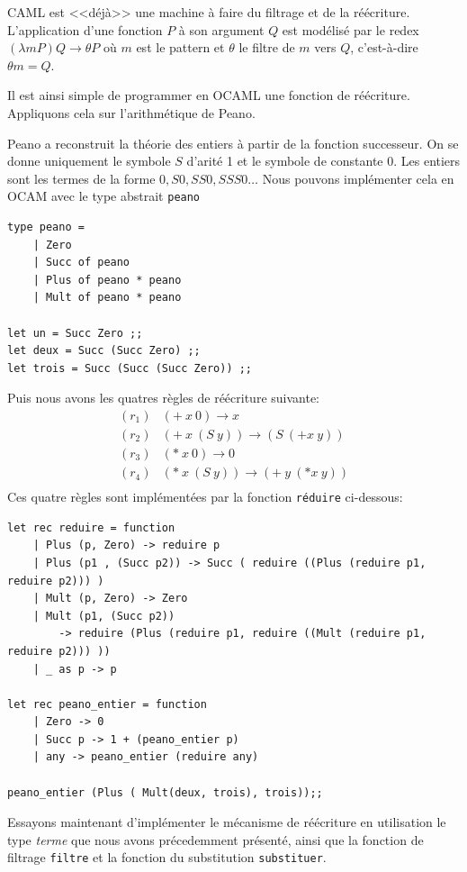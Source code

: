 \documentclass[11pt]{book}
\begin{document}
CAML est <<déjà>> une machine à faire du filtrage et de la réécriture. 
L'application d'une fonction $P$ à son argument $Q$ est modélisé par le redex
$(\lambda m P)Q \longrightarrow \theta P$ où $m$ est le pattern et $\theta$ le filtre de
$m$ vers $Q$, c'est-à-dire $\theta m = Q$.	


Il est ainsi simple de programmer en OCAML une fonction de réécriture.
Appliquons cela sur l'arithmétique de Peano.

Peano a reconstruit la théorie des
entiers à partir de la fonction successeur. On se donne uniquement le symbole
$S$ d'arité 1 et le symbole de constante 0.
Les entiers sont les termes de la forme $0, S0, SS0, SSS0 \ldots$
Nous pouvons implémenter cela en OCAM avec le type abstrait \verb+peano+
\begin{Verbatim}
type peano = 
	| Zero
	| Succ of peano
	| Plus of peano * peano
	| Mult of peano * peano

let un = Succ Zero ;;
let deux = Succ (Succ Zero) ;;
let trois = Succ (Succ (Succ Zero)) ;;
\end{Verbatim}

Puis nous avons les quatres règles de réécriture suivante:
$$
\begin{array}{ll}
(r_1) & (+\ x\ 0) \rightarrow x \\
(r_2) & (+\  x\ (S\ y)) \to (S\ (+x\ y)) \\
(r_3) & (*\ x\ 0) \to 0 \\
(r_4) & (*\ x\ (S\ y)) \to (+\ y\ (* x\ y)) \\
\end{array}
$$
Ces quatre règles sont implémentées par la fonction \verb+réduire+ ci-dessous:
\begin{Verbatim}
let rec reduire = function
	| Plus (p, Zero) -> reduire p
	| Plus (p1 , (Succ p2)) -> Succ ( reduire ((Plus (reduire p1, reduire p2))) )
	| Mult (p, Zero) -> Zero
	| Mult (p1, (Succ p2)) 
	    -> reduire (Plus (reduire p1, reduire ((Mult (reduire p1, reduire p2))) ))
	| _ as p -> p 

let rec peano_entier = function
	| Zero -> 0
	| Succ p -> 1 + (peano_entier p)
	| any -> peano_entier (reduire any)
	
peano_entier (Plus ( Mult(deux, trois), trois));;
\end{Verbatim}

Essayons maintenant d'implémenter le mécanisme de réécriture en utilisation le type 
\textit{terme} que nous avons précedemment présenté, ainsi que la fonction de filtrage \verb+filtre+ et 
la fonction du substitution \verb+substituer+.
\end{document}

